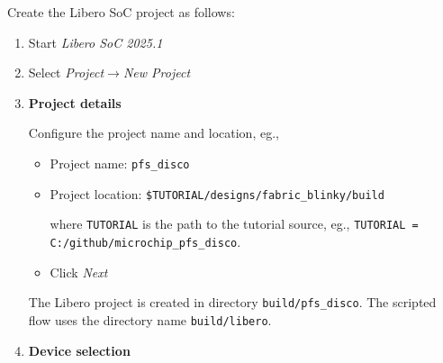 Create the Libero SoC project as follows:
%
\begin{enumerate}
\item Start \emph{Libero SoC 2025.1}
\item Select \emph{Project$\rightarrow$New Project}
\item \textbf{Project details}

Configure the project name and location, eg.,
\begin{itemize}
\item Project name: \verb+pfs_disco+
\item Project location:
\verb+$TUTORIAL/designs/fabric_blinky/build+%

where \verb+TUTORIAL+ is the path to the tutorial source, eg.,\newline
\verb+TUTORIAL = C:/github/microchip_pfs_disco+.
\item Click \emph{Next}
\end{itemize}
The Libero project is created in directory \verb+build/pfs_disco+. The scripted
flow uses the directory name \verb+build/libero+.
%
\item \textbf{Device selection}


\end{enumerate}
